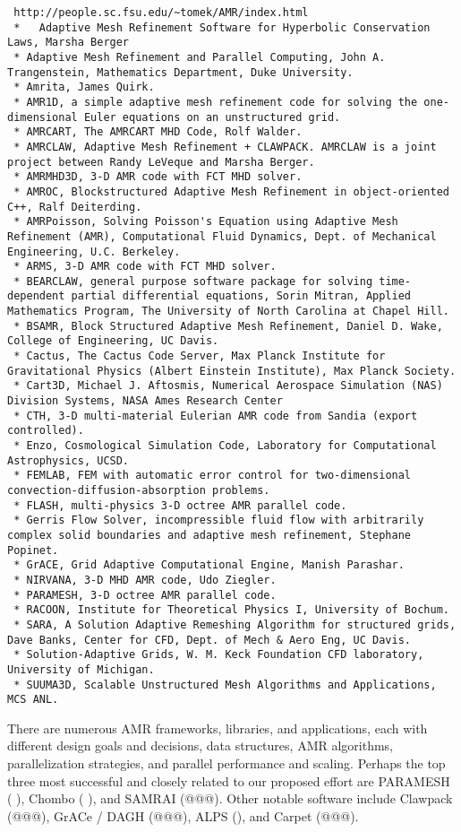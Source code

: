 \documentclass[14pt,letter]{article}
\begin{document}
\begin{verbatim}
 http://people.sc.fsu.edu/~tomek/AMR/index.html
 *   Adaptive Mesh Refinement Software for Hyperbolic Conservation Laws, Marsha Berger
 * Adaptive Mesh Refinement and Parallel Computing, John A. Trangenstein, Mathematics Department, Duke University.
 * Amrita, James Quirk.
 * AMR1D, a simple adaptive mesh refinement code for solving the one-dimensional Euler equations on an unstructured grid.
 * AMRCART, The AMRCART MHD Code, Rolf Walder.
 * AMRCLAW, Adaptive Mesh Refinement + CLAWPACK. AMRCLAW is a joint project between Randy LeVeque and Marsha Berger.
 * AMRMHD3D, 3-D AMR code with FCT MHD solver.
 * AMROC, Blockstructured Adaptive Mesh Refinement in object-oriented C++, Ralf Deiterding.
 * AMRPoisson, Solving Poisson's Equation using Adaptive Mesh Refinement (AMR), Computational Fluid Dynamics, Dept. of Mechanical Engineering, U.C. Berkeley.
 * ARMS, 3-D AMR code with FCT MHD solver.
 * BEARCLAW, general purpose software package for solving time-dependent partial differential equations, Sorin Mitran, Applied Mathematics Program, The University of North Carolina at Chapel Hill.
 * BSAMR, Block Structured Adaptive Mesh Refinement, Daniel D. Wake, College of Engineering, UC Davis.
 * Cactus, The Cactus Code Server, Max Planck Institute for Gravitational Physics (Albert Einstein Institute), Max Planck Society.
 * Cart3D, Michael J. Aftosmis, Numerical Aerospace Simulation (NAS) Division Systems, NASA Ames Research Center
 * CTH, 3-D multi-material Eulerian AMR code from Sandia (export controlled).
 * Enzo, Cosmological Simulation Code, Laboratory for Computational Astrophysics, UCSD.
 * FEMLAB, FEM with automatic error control for two-dimensional convection-diffusion-absorption problems.
 * FLASH, multi-physics 3-D octree AMR parallel code.
 * Gerris Flow Solver, incompressible fluid flow with arbitrarily complex solid boundaries and adaptive mesh refinement, Stephane Popinet.
 * GrACE, Grid Adaptive Computational Engine, Manish Parashar.
 * NIRVANA, 3-D MHD AMR code, Udo Ziegler.
 * PARAMESH, 3-D octree AMR parallel code.
 * RACOON, Institute for Theoretical Physics I, University of Bochum.
 * SARA, A Solution Adaptive Remeshing Algorithm for structured grids, Dave Banks, Center for CFD, Dept. of Mech & Aero Eng, UC Davis.
 * Solution-Adaptive Grids, W. M. Keck Foundation CFD laboratory, University of Michigan.
 * SUUMA3D, Scalable Unstructured Mesh Algorithms and Applications, MCS ANL. 
\end{verbatim}

There are numerous AMR frameworks, libraries, and applications, each
with different design goals and decisions, data structures, AMR
algorithms, parallelization strategies, and parallel performance and
scaling.  Perhaps the top three most successful and closely related to
our proposed effort are PARAMESH (\cite{MaOl00} \nocite{OlMa05}
\nocite{Ol06}), Chombo (\cite{wwwchombo} \cite{CoGr09}), and SAMRAI
(@@@).  Other notable software include Clawpack (@@@), GrACe / DAGH
(@@@), ALPS (\cite{BuBu09}), and Carpet (@@@).
\end{document}
